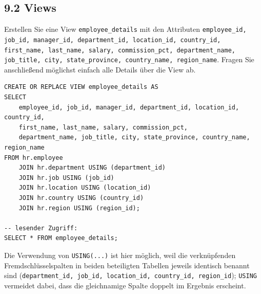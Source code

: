 \documentclass[11pt,a4paper]{article}
\begin{document}
\subsection*{9.2 \quad Views}
Erstellen Sie eine View \texttt{employee\_details} mit den Attributen \texttt{employee\_id, job\_id, manager\_id, department\_id, location\_id, country\_id, first\_name, last\_name, salary, commission\_pct, department\_name, job\_title, city, state\_province, country\_name, region\_name}. Fragen Sie anschlie\ss{}end m\"oglichst einfach alle Details \"uber die View ab.
\begin{loesung}
\begin{lstlisting}
CREATE OR REPLACE VIEW employee_details AS
SELECT
    employee_id, job_id, manager_id, department_id, location_id, country_id,
    first_name, last_name, salary, commission_pct,
    department_name, job_title, city, state_province, country_name, region_name
FROM hr.employee
    JOIN hr.department USING (department_id)
    JOIN hr.job USING (job_id)
    JOIN hr.location USING (location_id)
    JOIN hr.country USING (country_id)
    JOIN hr.region USING (region_id);

-- lesender Zugriff:
SELECT * FROM employee_details;
\end{lstlisting}
Die Verwendung von \texttt{USING(...)} ist hier m\"oglich, weil die verkn\"upfenden Fremdschl\"usselspalten in beiden beteiligten Tabellen jeweils identisch benannt sind (\texttt{department\_id, job\_id, location\_id, country\_id, region\_id}); \texttt{USING} vermeidet dabei, dass die gleichnamige Spalte doppelt im Ergebnis erscheint.
\end{loesung}
\end{document}
